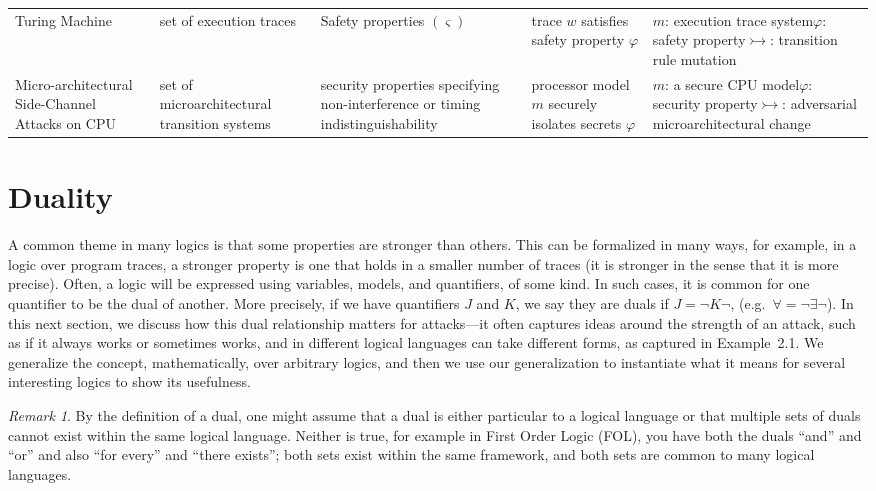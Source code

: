 \documentclass[11pt]{amsart}
\theoremstyle{definition}
\theoremstyle{remark}
\newtheorem*{remark}{Remark}
\newcommand{\adv}{\rightarrowtail}   %
\begin{document}
\begin{longtable}{L{2.2cm} L{2.4cm} L{3.3cm} L{2.8cm} L{4.0cm}}
\addlinespace
Turing Machine & set of execution traces & Safety properties $(\varsigma)$ & trace $w$ satisfies safety property $\varphi$ &
$m$: execution trace system\newline $\varphi$: safety property\newline $\adv$: transition rule mutation \\
\addlinespace
Micro-architectural Side-Channel Attacks on CPU & set of microarchitectural transition systems & security properties specifying non-interference or timing indistinguishability & processor model $m$ securely isolates secrets $\varphi$ &
$m$: a secure CPU model\newline $\varphi$: security property\newline $\adv$: adversarial microarchitectural change \\
\bottomrule
\end{longtable}
\endgroup

\section{Duality}

A common theme in many logics is that some properties are stronger than others. This can be formalized
in many ways, for example, in a logic over program traces, a stronger property is one that holds in a
smaller number of traces (it is stronger in the sense that it is more precise). Often, a logic will be
expressed using variables, models, and quantifiers, of some kind. In such cases, it is common for one
quantifier to be the dual of another. More precisely, if we have quantifiers $J$ and $K$, we say they are duals
if $J = \neg K \neg$, (e.g.\ $\forall = \neg \exists \neg$). In this next section, we discuss how this dual relationship
matters for attacks---it often captures ideas around the strength of an attack, such as if it always works or
sometimes works, and in different logical languages can take different forms, as captured in Example~2.1.
We generalize the concept, mathematically, over arbitrary logics, and then we use our generalization to
instantiate what it means for several interesting logics to show its usefulness.

\begin{remark}
By the definition of a dual, one might assume that a dual is either particular to a logical language or that
multiple sets of duals cannot exist within the same logical language. Neither is true, for example in First
Order Logic (FOL), you have both the duals ``and'' and ``or'' and also ``for every'' and ``there exists''; both
sets exist within the same framework, and both sets are common to many logical languages.
\end{remark}
\end{document}
